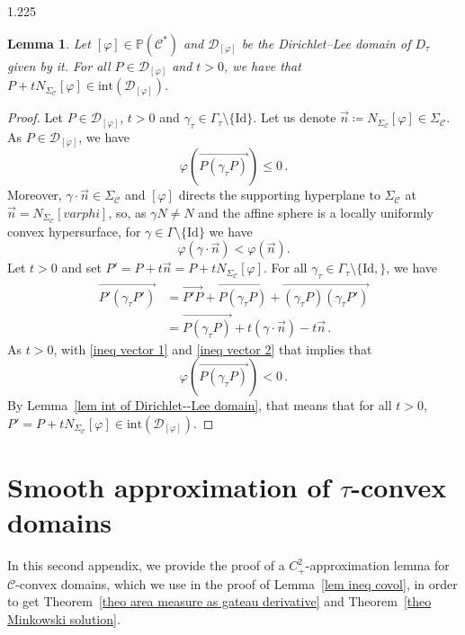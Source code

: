 \documentclass[reqno, a4paper]{amsart}
\numberwithin{equation}{section}
\numberwithin{figure}{section}
\newtheorem{lemma}[theorem]{Lemma}
\theoremstyle{definition}
\theoremstyle{remark}
\renewcommand{\P}{\mathbb{P}} %
\newcommand{\Id}{\mathrm{Id}} %
\newcommand{\C}{\mathcal{C}} %
\renewcommand{\S}{\Sigma_\C} %
\newcommand{\DL}{\mathcal{D}} %
\newcommand{\vp}[1]{{\left( {#1} \right)}} %
\begin{document}
\begin{spacing}{1.225}
\begin{lemma}
\label{lem for covolume cvx proof}
Let $[\varphi]\in \P(\C^*)$ and $\DL_{[\varphi]}$ be the Dirichlet--Lee domain of $D_\tau$ given by it. For all $P \in \DL_{[\varphi]}$ and $t>0$, we have that $ P + tN_{\S}[\varphi] \in \mathrm{int}(\DL_{[\varphi]})$. 
\end{lemma}
\begin{proof}
Let $P \in \DL_{[\varphi]}$, $t >0$ and $\gamma_\tau \in \Gamma_\tau \setminus\{\Id\}$. Let us denote $\vec{n} \coloneqq N_{\S}[\varphi] \in \S$. As $P \in \DL_{[\varphi]}$, we have 
\begin{equation}
\label{ineq vector 1}
 \varphi\vp{\overrightarrow{P(\gamma_\tau P)}}\leq 0 \, . 
\end{equation}
Moreover, $\gamma \cdot \vec{n} \in \S$ and $[\varphi]$ directs the supporting hyperplane to $\S$ at $\vec{n} = N_{\S}[varphi]$, so, as $\gamma N \neq N$ and the affine sphere is a locally uniformly convex hypersurface, for $\gamma \in \Gamma \setminus \{\Id\}$ we have
\begin{equation}
\label{ineq vector 2}
 \varphi(\gamma \cdot \vec{n}) < \varphi(\vec{n}). 
\end{equation}
Let $t >0$ and set $P' = P + t\vec{n} =P + t N_{\S}[\varphi]$. For all $\gamma_\tau \in \Gamma_\tau\setminus\{\Id,\}$, we have
\begin{align*}
\overrightarrow{P'(\gamma_\tau P')}& = \overrightarrow{P'P}+ \overrightarrow{P(\gamma_\tau P)}+\overrightarrow{(\gamma_\tau P)(\gamma_\tau P')} \\
& = \overrightarrow{P(\gamma_\tau P)} + t(\gamma \cdot \vec{n}) -t\vec{n} \, .
\end{align*}
As $t>0$, with \eqref{ineq vector 1} and \eqref{ineq vector 2} that implies that 
\begin{equation*}
 \varphi\vp{\overrightarrow{P(\gamma_\tau P)}} < 0 \, . 
\end{equation*}
By Lemma~\ref{lem int of Dirichlet--Lee domain}, that means that for all $t>0$, $P'= P + t N_{\S}[\varphi] \in \mathrm{int}(\DL_{[\varphi]})$. 
\end{proof}

\section{\texorpdfstring{Smooth approximation of $\tau$-convex domains}{Smooth approximation of tau-convex domains}}
\label{app C2+-approximation}

In this second appendix, we provide the proof of a $C^2_+$-approximation lemma for $\C$-convex domains, which we use in the proof of Lemma~\ref{lem ineq covol}, in order to get Theorem~\ref{theo area measure as gateau derivative} and Theorem~\ref{theo Minkowski solution}. 


\end{spacing}
\end{document}
